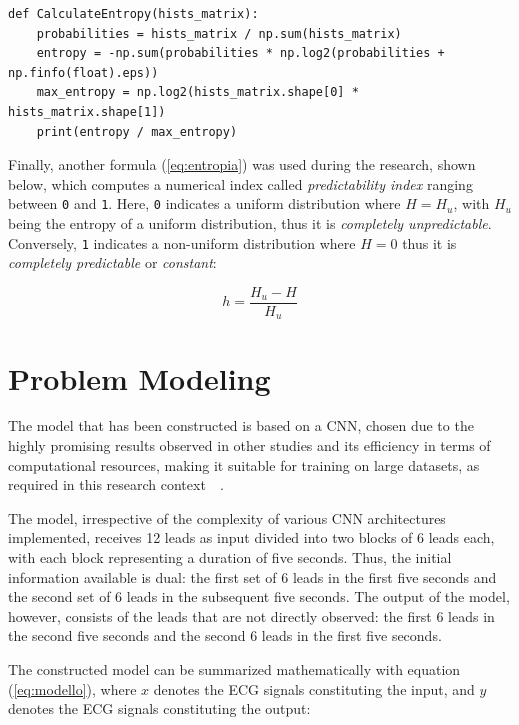 \documentclass[12pt,english]{report}
\begin{document}
\lstset{language=Python}
\begin{lstlisting}[aboveskip=15pt, belowskip=15pt, basicstyle=\fontsize{8}{10}\selectfont, keywordstyle=\color{blue}, breaklines=true, label=snippet:entropia]
def CalculateEntropy(hists_matrix):
    probabilities = hists_matrix / np.sum(hists_matrix)
    entropy = -np.sum(probabilities * np.log2(probabilities + np.finfo(float).eps))
    max_entropy = np.log2(hists_matrix.shape[0] * hists_matrix.shape[1])
    print(entropy / max_entropy)
\end{lstlisting}

Finally, another formula (\ref{eq:entropia}) was used during the research, shown below, which computes a numerical index called \textit{predictability index} ranging between \texttt{0} and \texttt{1}. Here, \texttt{0} indicates a uniform distribution where $ H = H_{u} $, with $ H_{u} $ being the entropy of a uniform distribution, thus it is \textit{completely unpredictable}. Conversely, \texttt{1} indicates a non-uniform distribution where $ H = 0 $ thus it is \textit{completely predictable} or \textit{constant}:

\begin{equation}
    h = \frac{H_{u} - H}{H_{u}}
    \label{eq:entropia}
\end{equation}

\section{Problem Modeling}
\label{sec:modellazione}

The model that has been constructed is based on a CNN, chosen due to the highly promising results observed in other studies and its efficiency in terms of computational resources, making it suitable for training on large datasets, as required in this research context~\cite{ribeiro}~\cite{hannun}.

The model, irrespective of the complexity of various CNN architectures implemented, receives 12 leads as input divided into two blocks of 6 leads each, with each block representing a duration of five seconds. Thus, the initial information available is dual: the first set of 6 leads in the first five seconds and the second set of 6 leads in the subsequent five seconds. The output of the model, however, consists of the leads that are not directly observed: the first 6 leads in the second five seconds and the second 6 leads in the first five seconds.

The constructed model can be summarized mathematically with equation (\ref{eq:modello}), where $ x $ denotes the ECG signals constituting the input, and $ y $ denotes the ECG signals constituting the output:
\end{document}
